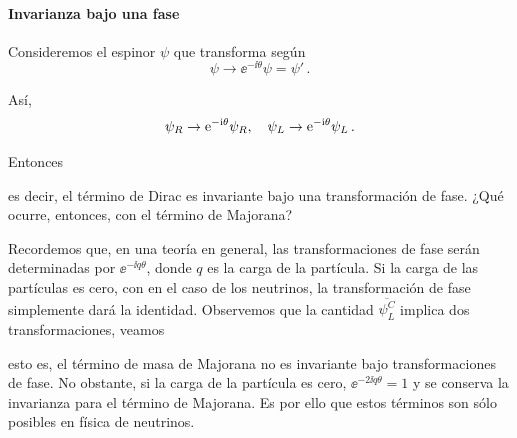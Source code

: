 \paragraph{Invarianza bajo una fase}

Consideremos el espinor $\psi$ que transforma según
%
\begin{equation}
	\psi \rightarrow \ee^{-\ii \theta}\psi = \psi' \,.
\end{equation}

Así,
%
\begin{equation}
	\psi_R \rightarrow \ee^{-\ii \theta} \psi_R \qc \psi_L \rightarrow \ee^{-\ii \theta} \psi_L \,.
\end{equation}

Entonces
%

\noindent es decir, el término de Dirac es invariante bajo una transformación de fase. ¿Qué ocurre, entonces, con el término de Majorana?

Recordemos que, en una teoría en general, las transformaciones de fase serán determinadas por $\ee^{-\ii q \theta}$, donde $q$ es la carga de la partícula. Si la carga de las partículas es cero, con en el caso de los neutrinos, la transformación de fase simplemente dará la identidad. Observemos que la cantidad $\overline{\psi^C_L}$ implica dos transformaciones, veamos
%

\noindent esto es, el término de masa de Majorana no es invariante bajo transformaciones de fase. No obstante, si la carga de la partícula es cero, $\ee^{-2\ii q\theta} = 1$ y se conserva la invarianza para el término de Majorana. Es por ello que estos términos son sólo posibles en física de neutrinos. \\





